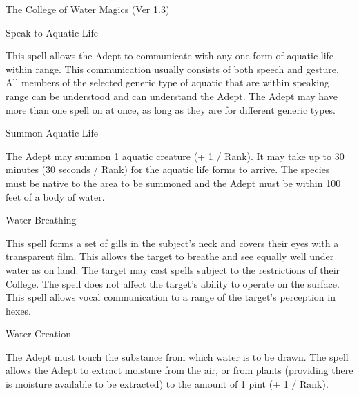 \begin{Chapter}{The College of Water Magics (Ver 1.3)}
\begin{spell}[G-9]{Speak to Aquatic Life}
\begin{effects}
This spell allows the Adept to communicate with any one form of
aquatic life within range.  This communication usually consists of
both speech and gesture.  All members of the selected generic type of
aquatic that are within speaking range can be understood and can
understand the Adept. The Adept may have more than one spell on at
once, as long as they are for different generic types.
\end{effects}
\end{spell}

\begin{spell}[G-10]{Summon Aquatic Life}

\begin{effects}
The Adept may summon 1 aquatic creature (+ 1 / Rank).  It may take up
to 30 minutes (30 seconds / Rank) for the aquatic life forms to
arrive.  The species must be native to the area to be summoned and
the Adept must be within 100 feet of a body of water.
\end{effects}
\end{spell}

\begin{spell}[G-11]{Water Breathing}

\begin{effects}
This spell forms a set of gills in the subject’s neck and covers their
eyes with a transparent film.  This allows the target to breathe and
see equally well under water as on land.  The target may cast spells
subject to the restrictions of their College. The spell does not
affect the target’s ability to operate on the surface.  This spell
allows vocal communication to a range of the target’s perception in
hexes.
\end{effects}
\end{spell}

\begin{spell}[G-12]{Water Creation}

\begin{effects}
The Adept must touch the substance from which water is to be drawn.
The spell allows the Adept to extract moisture from the air, or from
plants (providing there is moisture available to be extracted) to the
amount of 1 pint (+ 1 / Rank).
\end{effects}
\end{spell}


\end{Chapter}
